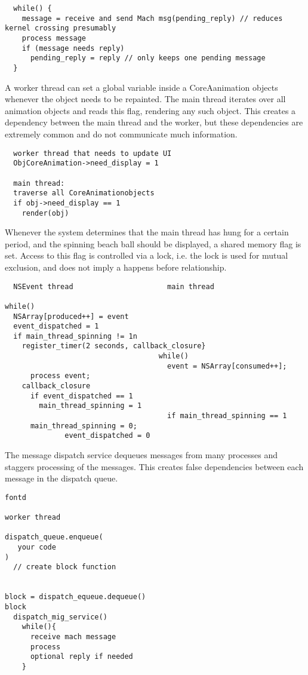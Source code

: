 {\footnotesize \begin{verbatim}
  while() {
    message = receive and send Mach msg(pending_reply) // reduces
kernel crossing presumably
    process message
    if (message needs reply)
      pending_reply = reply // only keeps one pending message
  }
\end{verbatim}
}

A worker thread can set a global variable inside a CoreAanimation objects
whenever the object needs to be repainted. The main thread iterates over all
animation objects and reads this flag, rendering any such object. This creates
a dependency between the main thread and the worker, but these dependencies are
extremely common and do not communicate much information.

{\footnotesize \begin{verbatim}
  worker thread that needs to update UI
  ObjCoreAnimation->need_display = 1

  main thread:
  traverse all CoreAnimationobjects
  if obj->need_display == 1
    render(obj)
\end{verbatim}
}

Whenever the system determines that the main thread has hung for a certain
period, and the spinning beach ball should be displayed, a shared memory flag
is set. Access to this flag is controlled via a lock, i.e. the lock is used for
mutual exclusion, and does not imply a happens before relationship.

{\footnotesize \begin{verbatim}
  NSEvent thread                      main thread

while()
  NSArray[produced++] = event
  event_dispatched = 1
  if main_thread_spinning != 1n
    register_timer(2 seconds, callback_closure}
                                    while()
                                      event = NSArray[consumed++];
      process event;
    callback_closure
      if event_dispatched == 1
        main_thread_spinning = 1
                                      if main_thread_spinning == 1
      main_thread_spinning = 0;
              event_dispatched = 0
\end{verbatim}
}

The message dispatch service dequeues messages from many processes and staggers
processing of the messages. This creates false dependencies between each
message in the dispatch queue.
{\footnotesize \begin{verbatim}
fontd

worker thread

dispatch_queue.enqueue(
   your code
)
  // create block function


block = dispatch_equeue.dequeue()
block
  dispatch_mig_service()
    while(){
      receive mach message
      process
      optional reply if needed
    }
\end{verbatim}
}

